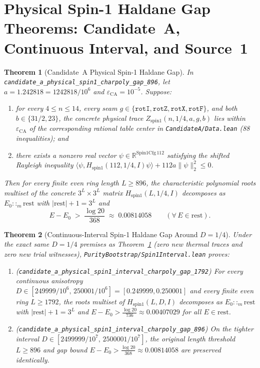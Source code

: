 \documentclass[11pt,a4paper]{article}
\newcommand{\id}[1]{{\small\nolinkurl{#1}}}
\newtheorem{theorem}{Theorem}[section]
\newcommand{\R}{\mathbb{R}}
\begin{document}
\section{Physical Spin-1 Haldane Gap Theorems: Candidate~A, Continuous Interval, and Source~1}

\begin{theorem}[Candidate~A Physical Spin-1 Haldane Gap]
\label{thm:candA}
In \id{candidate_a_physical_spin1_charpoly_gap_896}, let $a = 1.242818 = 1242818/10^6$ and $\varepsilon_{\mathrm{CA}} = 10^{-5}$. Suppose:
\begin{enumerate}[leftmargin=1.8em,itemsep=2pt]
  \item for every $4 \le n \le 14$, every seam $g \in \{\texttt{rotI}, \texttt{rotZ}, \texttt{rotX}, \texttt{rotF}\}$, and both $b \in \{31/2, 23\}$, the concrete physical trace $Z_{\mathrm{spin1}}(n, 1/4, a, g, b)$ lies within $\varepsilon_{\mathrm{CA}}$ of the corresponding rational table center in \id{CandidateA/Data.lean} (88 inequalities); and
  \item there exists a nonzero real vector $\psi \in \R^{\mathrm{Spin1Cfg}\,112}$ satisfying the shifted Rayleigh inequality $\langle \psi, H_{\mathrm{spin1}}(112, 1/4, I)\psi \rangle + 112 a \|\psi\|_2^2 \le 0$.
\end{enumerate}
Then for \emph{every finite even ring length $L \ge 896$}, the characteristic polynomial roots multiset of the concrete $3^L \times 3^L$ matrix $H_{\mathrm{spin1}}(L, 1/4, I)$ decomposes as $E_0 ::_m \mathrm{rest}$ with $|\mathrm{rest}| + 1 = 3^L$ and
\[
  E - E_0 \;>\; \frac{\log 20}{368} \;\approx\; 0.00814058 \qquad (\forall\, E \in \mathrm{rest}).
\]
\end{theorem}

\begin{theorem}[Continuous-Interval Spin-1 Haldane Gap Around $D = 1/4$]
\label{thm:candA_interval}
Under the exact same $D = 1/4$ premises as Theorem~\ref{thm:candA} (zero new thermal traces and zero new trial witnesses), \id{PurityBootstrap/Spin1Interval.lean} proves:
\begin{enumerate}[leftmargin=1.8em,itemsep=2pt]
  \item (\id{candidate_a_physical_spin1_interval_charpoly_gap_1792}) For \emph{every} continuous anisotropy $D \in [249999/10^6,\, 250001/10^6] = [0.249999, 0.250001]$ and \emph{every} finite even ring $L \ge 1792$, the roots multiset of $H_{\mathrm{spin1}}(L, D, I)$ decomposes as $E_0 ::_m \mathrm{rest}$ with $|\mathrm{rest}| + 1 = 3^L$ and $E - E_0 > \frac{\log 20}{736} \approx 0.00407029$ for all $E \in \mathrm{rest}$.
  \item (\id{candidate_a_physical_spin1_interval_charpoly_gap_896}) On the tighter interval $D \in [2499999/10^7,\, 2500001/10^7]$, the original length threshold $L \ge 896$ and gap bound $E - E_0 > \frac{\log 20}{368} \approx 0.00814058$ are preserved identically.
\end{enumerate}
\end{theorem}
\end{document}
